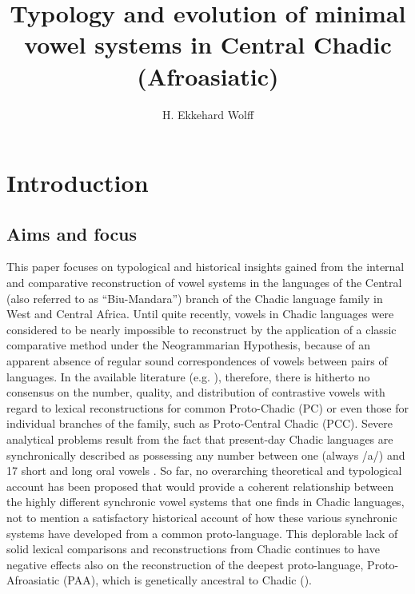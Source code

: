 \documentclass[output=paper]{langscibook}
\author{H. Ekkehard Wolff\orcid{}\affiliation{Universität Leipzig}}
\title[Typology and evolution of minimal vowel systems in Central Chadic ]{Typology and evolution of minimal vowel systems in Central Chadic (Afroasiatic)}
\begin{document}
\maketitle 

\section{Introduction}
\label{sec:Wolff:1}
\subsection{Aims and focus}
\label{sec:Wolff:1.1}

This paper focuses on typological and historical insights gained from the internal and comparative reconstruction of vowel systems in the languages of the Central (also referred to as ``Biu-Mandara'') branch of the Chadic language family in West and Central Africa. Until quite recently, vowels in Chadic languages were considered to be nearly impossible to reconstruct by the application of a classic comparative method under the Neogrammarian Hypothesis, because of an apparent absence of regular sound correspondences of vowels between pairs of languages. In the available literature (e.g. \citealt{Newman1977, Newman2006, JungraithmayrShimizu1981, Stolbova2016, Wolff2017}), therefore, there is hitherto no consensus on the number, quality, and distribution of contrastive vowels with regard to lexical reconstructions for common Proto-Chadic (PC) or even those for individual branches of the family, such as Proto-Central Chadic (PCC). Severe analytical problems result from the fact that present-day Chadic languages are synchronically described as possessing any number between one (always \mbox{/a/}) and 17 short and long oral vowels \citep{Wolff2017}. So far, no overarching theoretical and typological account has been proposed that would provide a coherent relationship between the highly different synchronic vowel systems that one finds in Chadic languages, not to mention a satisfactory historical account of how these various synchronic systems have developed from a common proto-language. This deplorable lack of solid lexical comparisons and reconstructions from Chadic continues to have negative effects also on the reconstruction of the deepest proto-language, Proto-Afroasiatic (PAA), which is genetically ancestral to Chadic (\citealt{Greenberg1963, Newman1980}).
\end{document}
